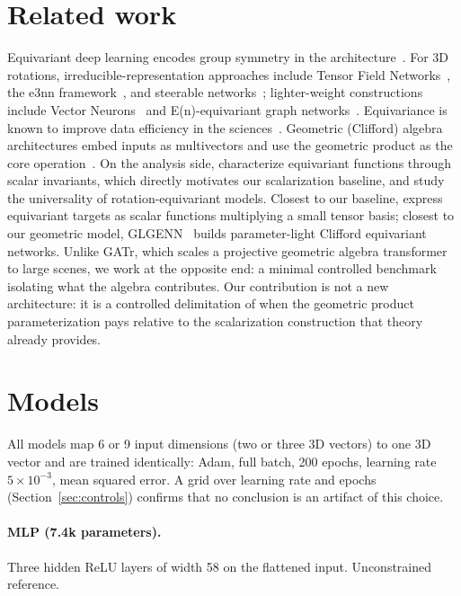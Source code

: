 \documentclass[11pt]{article}
\begin{document}
\section{Related work}
\label{sec:related}

Equivariant deep learning encodes group symmetry in the
architecture~\citep{cohen2016group,bronstein2021geometric}. For 3D rotations,
irreducible-representation approaches include Tensor Field
Networks~\citep{thomas2018tensor}, the e3nn framework~\citep{geiger2022e3nn},
and steerable networks~\citep{weiler2019general}; lighter-weight constructions
include Vector Neurons~\citep{deng2021vector} and E(n)-equivariant graph
networks~\citep{satorras2021egnn}. Equivariance is known to improve data
efficiency in the sciences~\citep{batzner2022nequip}. Geometric (Clifford)
algebra architectures embed inputs as multivectors and use the geometric
product as the core operation~\citep{brandstetter2022clifford,
ruhe2023clifford, brehmer2023geometric}. On the analysis side,
\citet{villar2021scalars} characterize equivariant functions through scalar
invariants, which directly motivates our scalarization baseline, and
\citet{dym2020universality} study the universality of rotation-equivariant
models. Closest to our baseline, \citet{domina2025spherical} express
equivariant targets as scalar functions multiplying a small tensor basis;
closest to our geometric model, GLGENN~\citep{filimoshina2025glgenn} builds
parameter-light Clifford equivariant networks. Unlike GATr, which scales a
projective geometric algebra transformer to large scenes, we work at the
opposite end: a minimal controlled benchmark isolating what the algebra
contributes. Our contribution is not a new architecture: it is a controlled
delimitation of when the geometric product parameterization pays relative to
the scalarization construction that theory already provides.

\section{Models}
\label{sec:models}

All models map 6 or 9 input dimensions (two or three 3D vectors) to one 3D
vector and are trained identically: Adam, full batch, 200 epochs, learning
rate $5\times 10^{-3}$, mean squared error. A grid over learning rate and
epochs (Section~\ref{sec:controls}) confirms that no conclusion is an
artifact of this choice.

\paragraph{MLP (7.4k parameters).} Three hidden ReLU layers of width 58 on the
flattened input. Unconstrained reference.
\end{document}
